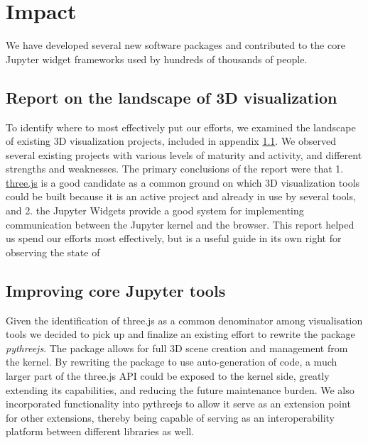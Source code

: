 \documentclass{deliverablereport}
\begin{document}

\section{Impact}

We have developed several new software packages and contributed to the core Jupyter widget frameworks used by hundreds of thousands of people.

\subsection{Report on the landscape of 3D visualization}\label{landscape}

To identify where to most effectively put our efforts,
we examined the landscape of existing 3D visualization projects,
included in appendix \ref{landscape}.
We observed several existing projects with various levels of maturity and activity, and different strengths and weaknesses.
The primary conclusions of the report were that 1. \href{https://threejs.org}{three.js} is a good candidate as a common ground on which 3D visualization tools could be built because it is an active project and already in use by several tools, and 2. the Jupyter Widgets provide a good system for implementing communication between the Jupyter kernel and the browser.
This report helped us spend our efforts most effectively,
but is a useful guide in its own right for observing the state of


\subsection{Improving core Jupyter tools}\label{improving-core}


Given the identification of three.js as a common denominator among visualisation tools
we decided to pick up and finalize an existing effort to rewrite the package
\emph{pythreejs}. The package allows for full 3D scene creation and management from the
kernel. By rewriting the package to use auto-generation of code, a much larger
part of the three.js API could be exposed to the kernel side, greatly extending
its capabilities, and reducing the future maintenance burden. We also incorporated
functionality into pythreejs to allow it serve as an extension
point for other extensions, thereby being capable of serving as an interoperability
platform between different libraries as well.
\end{document}
